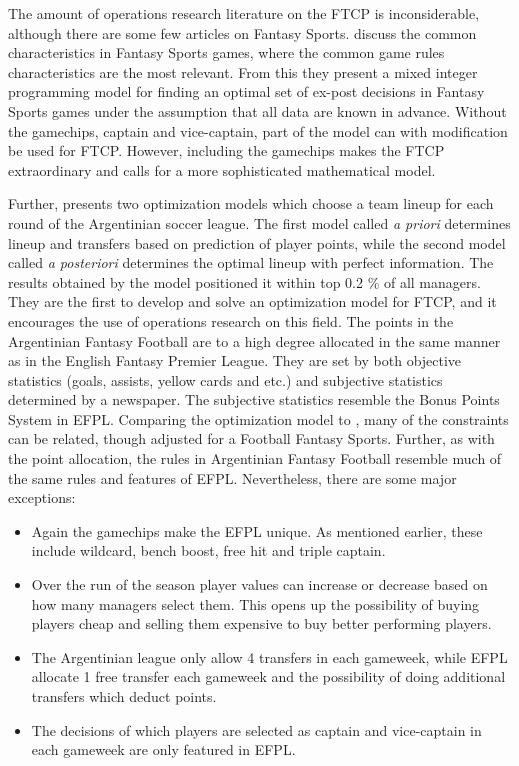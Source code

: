 \newpar

The amount of operations research literature on the FTCP is inconsiderable, although there are some few articles on Fantasy Sports. \cite{Mathsports} discuss the common characteristics in Fantasy Sports games, where the common game rules characteristics are the most relevant. From this they present a mixed integer programming model for finding an optimal set of ex-post decisions in Fantasy Sports games under the assumption that all data are known in advance. Without the gamechips, captain and vice-captain, part of the model can with modification be used for FTCP. However, including the gamechips makes the FTCP extraordinary and calls for a more sophisticated mathematical model. 

\newpar

Further, \cite{Bonomo} presents two optimization models which choose a team lineup for each round of the Argentinian soccer league. The first model called \textit{a priori} determines lineup and transfers based on prediction of player points, while the second model called \textit{a posteriori} determines the optimal lineup with perfect information. The results obtained by the model positioned it within top 0.2 \% of all managers. They are the first to develop and solve an optimization model for FTCP, and it encourages the use of operations research on this field. The points in the Argentinian Fantasy Football are to a high degree allocated in the same manner as in the English Fantasy Premier League. They are set by both objective statistics (goals, assists, yellow cards and etc.) and subjective statistics determined by a newspaper. The subjective statistics resemble the Bonus Points System in EFPL. Comparing the optimization model to \cite{Mathsports}, many of the constraints can be related, though adjusted for a Football Fantasy Sports. Further, as with the point allocation, the rules in Argentinian Fantasy Football resemble much of the same rules and features of EFPL. Nevertheless, there are some major exceptions: 


\begin{itemize}
    \item  Again the gamechips make the EFPL unique. As mentioned earlier, these include wildcard, bench boost, free hit and triple captain. 
    \item Over the run of the season player values can increase or decrease based on how many managers select them. This opens up the possibility of buying players cheap and selling them expensive to buy better performing players. 
    \item The Argentinian league only allow 4 transfers in each gameweek, while EFPL allocate 1 free transfer each gameweek and the possibility of doing additional transfers which deduct points.
    \item The decisions of which players are selected as captain and vice-captain in each gameweek are only featured in EFPL. 
\end{itemize}

